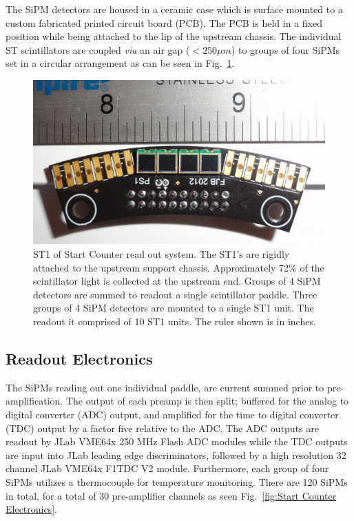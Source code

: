 The SiPM detectors are housed in a ceramic case which is surface mounted to a custom fabricated printed circuit board (PCB).  The PCB is held in a fixed position while being attached to the lip of the upstream chassis.  The individual ST scintillators are coupled \emph{via} an air gap ($< 250 \mu m$) to groups of four SiPMs set in a circular arrangement as can be seen in Fig.~\ref{fig:st1_mounted}.  
	\begin{figure}[!htb]
		\centering
		\includegraphics[width=1.0\columnwidth]{design/figs/st1_ruler}
		\caption{ST1 of Start Counter read out system. The ST1's are rigidly attached to the upstream support chassis.  Approximately 72\% of the scintillator light is collected at the upstream end.  Groups of 4 SiPM detectors are summed to readout a single scintillator paddle.  Three groups of 4 SiPM detectors are mounted to a single ST1 unit. The readout it comprised of 10 ST1 units.  The ruler shown is in inches.}
		\label{fig:st1_mounted}
	\end{figure}

\subsection{Readout Electronics} \label{sec:design_electronics}

The SiPMs reading out one individual paddle, are current summed prior to pre-amplification.  The output of each preamp is then split; buffered for the analog to digital converter (ADC) output, and amplified for the time to digital converter (TDC) output by a factor five relative to the ADC.  The ADC outputs are readout by JLab VME64x 250 MHz Flash ADC modules while the TDC outputs are input into JLab leading edge discriminators, followed by a high resolution 32 channel JLab VME64x F1TDC V2 module.  Furthermore, each group of four SiPMs utilizes a thermocouple for temperature monitoring. There are 120 SiPMs in total, for a total of 30 pre-amplifier channels as seen Fig.~\ref{fig:Start Counter Electronics}.

